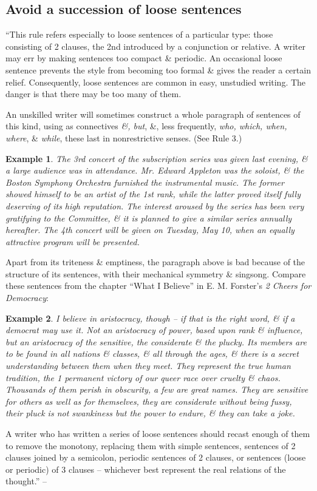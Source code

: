 \documentclass[oneside]{book}
\numberwithin{equation}{section}
\newtheorem{example}{Example}[chapter]
\begin{document}
\subsection{Avoid a succession of loose sentences}
``This rule refers especially to loose sentences of a particular type: those consisting of 2 clauses, the 2nd introduced by a conjunction or relative. A writer may err by making sentences too compact \& periodic. An occasional loose sentence prevents the style from becoming too formal \& gives the reader a certain relief. Consequently, loose sentences are common in easy, unstudied writing. The danger is that there may be too many of them.

An unskilled writer will sometimes construct a whole paragraph of sentences of this kind, using as connectives \textit{\&, but}, \&, less frequently, \textit{who, which, when, where}, \& \textit{while}, these last in nonrestrictive senses. (See Rule 3.)

\begin{example}
	The 3rd concert of the subscription series was given last evening, \& a large audience was in attendance. Mr. Edward Appleton was the soloist, \& the Boston Symphony Orchestra furnished the instrumental music. The former showed himself to be an artist of the 1st rank, while the latter proved itself fully deserving of its high reputation. The interest aroused by the series has been very gratifying to the Committee, \& it is planned to give a similar series annually hereafter. The 4th concert will be given on Tuesday, May 10, when an equally attractive program will be presented.
\end{example}
Apart from its triteness \& emptiness, the paragraph above is bad because of the structure of its sentences, with their mechanical symmetry \& singsong. Compare these sentences from the chapter ``What I Believe'' in E. M. Forster's \textit{2 Cheers for Democracy}:

\begin{example}
	I believe in aristocracy, though -- if that is the right word, \& if a democrat may use it. Not an aristocracy of power, based upon rank \& influence, but an aristocracy of the sensitive, the considerate \& the plucky. Its members are to be found in all nations \& classes, \& all through the ages, \& there is a secret understanding between them when they meet. They represent the true human tradition, the 1 permanent victory of our queer race over cruelty \& chaos. Thousands of them perish in obscurity, a few are great names. They are sensitive for others as well as for themselves, they are considerate without being fussy, their pluck is not swankiness but the power to endure, \& they can take a joke.
\end{example}
A writer who has written a series of loose sentences should recast enough of them to remove the monotony, replacing them with simple sentences, sentences of 2 clauses joined by a semicolon, periodic sentences of 2 clauses, or sentences (loose or periodic) of 3 clauses -- whichever best represent the real relations of the thought.'' -- \cite[Chap. 2, Sect. 18, pp. 39--40]{Strunk_White2019}
\end{document}
